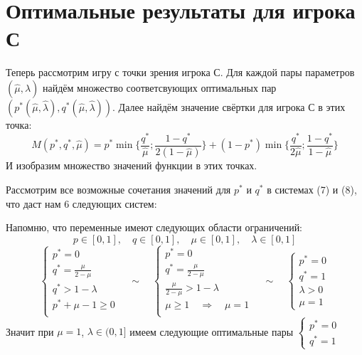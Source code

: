 \section{Оптимальные результаты для игрока С}

Теперь рассмотрим игру с точки зрения игрока С. Для каждой пары параметров $(\hat\mu, \hat\lambda)$ найдём
множество соответсвующих оптимальных пар $(p^*(\hat\mu, \hat\lambda), q^*(\hat\mu, \hat\lambda))$. Далее 
найдём значение свёртки для игрока С в этих точка:
$$
M(p^*,q^*,\hat\mu)=p^*\min{\{\frac{q^*}{\hat\mu};\frac{1-q^*}{2(1-\hat\mu)}\}} +
				   (1-p^*)\min\{\frac{q^*}{2\hat\mu};\frac{1-q^*}{1-\hat\mu}\}
$$
И изобразим множество значений функции в этих точках.
\vspace{5mm}
 
Рассмотрим все возможные сочетания значений для $p^{*}$ и $q^{*}$ в системах (7) и (8), что даст нам 6 следующих систем:
\vspace{5mm}

Напомню, что переменные имеют следующих области ограничений:
\[
p \in [0, 1],\quad q \in [0, 1],\quad
\mu \in [0, 1],\quad \lambda \in [0, 1]
\]
\[
\begin{cases}
p^{*}=0 \\
q^{*}=\frac{\mu}{2-\mu} \\
q^{*}>1-\lambda \\
p^{*}+\mu-1\geq 0 \\
\end{cases}
\quad\sim\quad
\begin{cases}
p^{*}=0 \\
q^{*}=\frac{\mu}{2-\mu} \\
\frac{\mu}{2-\mu}>1-\lambda \\
\mu\geq 1 \quad\Rightarrow\quad \mu=1 \\
\end{cases}
\quad\sim\quad
\begin{cases}
p^{*}=0 \\
q^{*}=1 \\
\lambda>0 \\
\mu=1
\end{cases}
\]
Значит при $\mu=1$, $\lambda\in(0,1]$ имеем следующие оптимальные пары
$\begin{cases}p^{*}=0 \\ q^{*}=1 \end{cases}$

